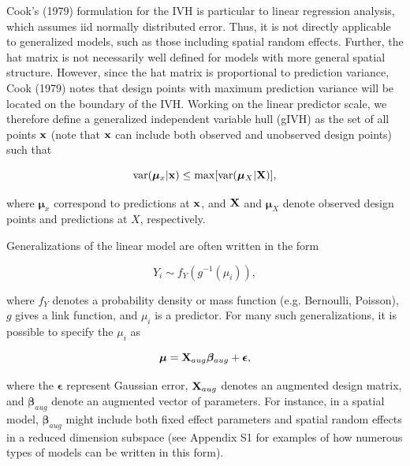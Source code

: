 \documentclass[12pt,english]{article}
\begin{document}
\begin{spacing}{1.9}
Cook's (1979) formulation for the IVH is particular to linear regression analysis, which assumes iid normally distributed error. Thus, it is not directly applicable to generalized models, such as those including spatial random effects.  Further, the hat matrix is not necessarily well defined for models with more general spatial structure. However, since the hat matrix is proportional to prediction variance, Cook (1979) notes that design points with maximum prediction variance will be located on the boundary of the IVH.  Working on the linear predictor scale, we therefore define a generalized independent variable hull (gIVH) as the set of all points ${\bf x}$ (note that ${\bf x}$ can include both observed and unobserved design points) such that
\begin{linenomath*}
\begin{equation}
  \label{eq:gIVH}
  {\rm var}(\boldsymbol{\mu}_x | {\bf x}) \le {\rm max} [{\rm var}(\boldsymbol{\mu}_X | {\bf X})],
\end{equation}
\end{linenomath*}
where $\boldsymbol{\mu}_x$ correspond to predictions at ${\bf x}$, and ${\bf X}$ and $\boldsymbol{\mu}_X$ denote observed design points and predictions at $X$, respectively.

Generalizations of the linear model are often written in the form
\begin{linenomath*}
\begin{equation}
  Y_i \sim f_Y(g^{-1}(\mu_i)),
\end{equation}
\end{linenomath*}
where $f_Y$ denotes a probability density or mass function (e.g. Bernoulli, Poisson), $g$ gives a link function, and
$\mu_i$ is a predictor.  For many such generalizations, it is possible to specify the $\mu_i$ as
\begin{linenomath*}
\begin{equation}
  \boldsymbol{\mu} = {\bf X}_{aug}\boldsymbol{\beta}_{aug} + \boldsymbol{\epsilon},
  \label{eq:mu-aug}
\end{equation}
\end{linenomath*}
where the $\boldsymbol{\epsilon}$ represent Gaussian error, ${\bf X}_{aug}$ denotes an augmented design matrix, and $\boldsymbol{\beta}_{aug}$ denote an augmented vector of parameters.  For instance, in a spatial model, $\boldsymbol{\beta}_{aug}$ might include both fixed effect parameters and spatial random effects in a reduced dimension subspace (see Appendix S1 for examples of how numerous types of models can be written in this form).


\end{spacing}
\end{document}
